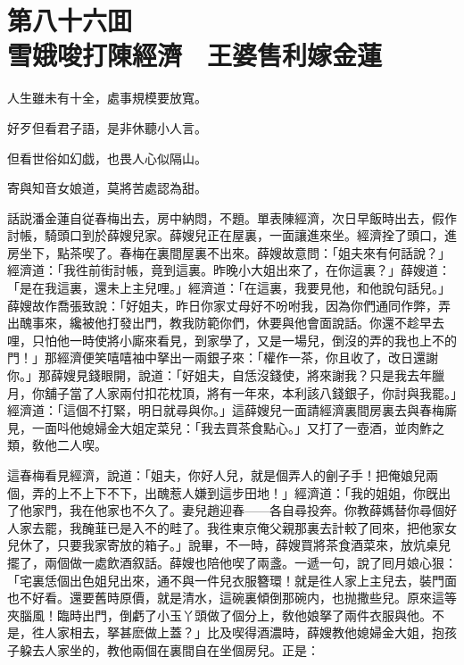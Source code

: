 
\chapter*{第八十六囬　\\雪娥唆打陳經濟　王婆售利嫁金蓮}


\begin{myquote}
人生雖未有十全，處事規模要放寬。

好歹但看君子語，是非休聽小人言。

但看世俗如幻戯，也畏人心似隔山。

寄與知音女娘道，莫將苦處認為甜。
\end{myquote}

話説潘金蓮自従春梅出去，房中納悶，不題。單表陳經濟，次日早飯時出去，假作討帳，騎頭口到於薛嫂兒家。薛嫂兒正在屋裏，一面讓進來坐。經濟拴了頭口，進房坐下，點茶喫了。春梅在裏間屋裏不出來。薛嫂故意問：「姐夫來有何話說？」經濟道：「我徃前街討帳，竟到這裏。昨晚小大姐出來了，在你這裏？」薛嫂道：「是在我這裏，還未上主兒哩。」經濟道：「在這裏，我要見他，和他說句話兒。」薛嫂故作喬張致說：「好姐夫，昨日你家丈母好不吩咐我，因為你們通同作弊，弄出醜事來，纔被他打發出門，教我防範你們，休要與他會面說話。你還不趁早去哩，只怕他一時使將小廝來看見，到家學了，又是一場兒，倒沒的弄的我也上不的門！」那經濟便笑嘻嘻袖中拏出一兩銀子來：「權作一茶，你且收了，改日還謝你。」那薛嫂見錢眼開，說道：「好姐夫，自恁沒錢使，將來謝我？只是我去年臘月，你舖子當了人家兩付扣花枕頂，將有一年來，本利該八錢銀子，你討與我罷。」經濟道：「這個不打緊，明日就尋與你。」這薛嫂兒一面請經濟裏間房裏去與春梅廝見，一面呌他媳婦金大姐定菜兒：「我去買茶食點心。」又打了一壺酒，並肉鮓之類，敎他二人喫。

這春梅看見經濟，說道：「姐夫，你好人兒，就是個弄人的劊子手！把俺娘兒兩個，弄的上不上下不下，出醜惹人嫌到這步田地！」經濟道：「我的姐姐，你旣出了他家門，我在他家也不久了。妻兒趙迎春——各自尋投奔。你教薛媽替你尋個好人家去罷，我醃韮已是入不的畦了。我徃東京俺父親那裏去計較了囘來，把他家女兒休了，只要我家寄放的箱子。」說畢，不一時，薛嫂買將茶食酒菜來，放炕桌兒擺了，兩個做一處飲酒叙話。薛嫂也陪他喫了兩盞。一遞一句，說了囘月娘心狠：「宅裏恁個出色姐兒出來，通不與一件兒衣服簪環！就是徃人家上主兒去，裝門面也不好看。還要舊時原價，就是清水，這碗裏傾倒那碗内，也抛撒些兒。原來這等夾腦風！臨時出門，倒虧了小玉丫頭做了個分上，敎他娘拏了兩件衣服與他。不是，徃人家相去，拏甚麽做上蓋？」比及喫得酒濃時，薛嫂教他媳婦金大姐，抱孩子躱去人家坐的，教他兩個在裏間自在坐個房兒。正是：

